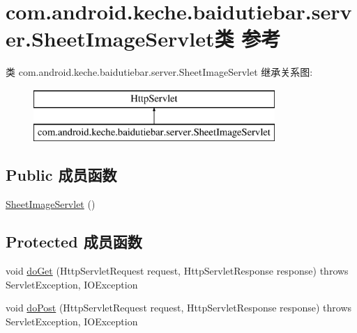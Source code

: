 \hypertarget{classcom_1_1android_1_1keche_1_1baidutiebar_1_1server_1_1_sheet_image_servlet}{}\section{com.\+android.\+keche.\+baidutiebar.\+server.\+Sheet\+Image\+Servlet类 参考}
\label{classcom_1_1android_1_1keche_1_1baidutiebar_1_1server_1_1_sheet_image_servlet}
类 com.\+android.\+keche.\+baidutiebar.\+server.\+Sheet\+Image\+Servlet 继承关系图\+:\begin{figure}[H]
\begin{center}
\leavevmode
\includegraphics[height=2.000000cm]{classcom_1_1android_1_1keche_1_1baidutiebar_1_1server_1_1_sheet_image_servlet}
\end{center}
\end{figure}
\subsection*{Public 成员函数}
\begin{DoxyCompactItemize}
\item 
\mbox{\hyperlink{classcom_1_1android_1_1keche_1_1baidutiebar_1_1server_1_1_sheet_image_servlet_a52aa8341c84e9124a61a5b8d89204e7b}{Sheet\+Image\+Servlet}} ()
\end{DoxyCompactItemize}
\subsection*{Protected 成员函数}
\begin{DoxyCompactItemize}
\item 
void \mbox{\hyperlink{classcom_1_1android_1_1keche_1_1baidutiebar_1_1server_1_1_sheet_image_servlet_a09e52cc17a77d0c96845f1d9342f0f02}{do\+Get}} (Http\+Servlet\+Request request, Http\+Servlet\+Response response)  throws Servlet\+Exception, I\+O\+Exception 
\item 
void \mbox{\hyperlink{classcom_1_1android_1_1keche_1_1baidutiebar_1_1server_1_1_sheet_image_servlet_af1fb2138384d4741e045a925abfa59e4}{do\+Post}} (Http\+Servlet\+Request request, Http\+Servlet\+Response response)  throws Servlet\+Exception, I\+O\+Exception 
\end{DoxyCompactItemize}


